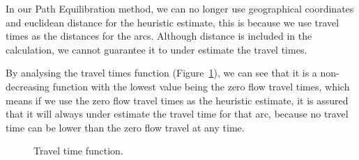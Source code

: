 In our Path Equilibration method,
we can no longer use geographical coordinates and euclidean distance for the heuristic estimate,
this is because we use travel times as the distances for the arcs.
Although distance is included in the calculation,
we cannot guarantee it to under estimate the travel times.

By analysing the travel times function (Figure~\ref{fig:flowfunction}),
we can see that it is a non-decreasing function with the lowest value being the zero flow travel times,
which means if we use the zero flow travel times as the heuristic estimate,
it is assured that it will always under estimate the travel time for that arc,
because no travel time can be lower than the zero flow travel at any time.

\begin{figure}[H]
    \centering
    \caption{Travel time function.}
    \label{fig:flowfunction}
\end{figure}

